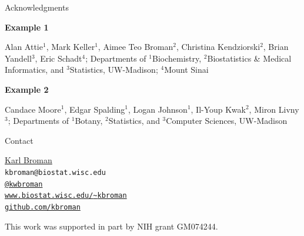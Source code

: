 \documentclass[final,plain]{beamer}
\newlength{\onecolwid}
\newcommand{\bluebold}{\color{dblue} \bf}
\newcommand{\coltwovsep}{\vspace{35.5mm}}
\begin{document}
\begin{frame}[t]
\begin{columns}[t]
\begin{column}{\onecolwid}
    \begin{block}{Acknowledgments}

      {\bluebold Example 1}

          \vspace{12pt}
          \hfill \begin{minipage}{0.165\paperwidth} Alan Attie$^1$,
            Mark Keller$^1$, Aimee Teo Broman$^2$, Christina
            Kendziorski$^2$, Brian Yandell$^3$, Eric Schadt$^4$;
            Departments of $^1$Biochemistry, $^2$Biostatistics \&
            Medical Informatics, and $^3$Statistics, UW-Madison;
            $^4$Mount Sinai
          \end{minipage}

          \vspace{24pt}

      {\bluebold Example 2}

          \vspace{12pt}
          \hfill \begin{minipage}{0.165\paperwidth} 
            Candace Moore$^1$, Edgar Spalding$^1$, Logan Johnson$^1$, Il-Youp Kwak$^2$,
            Miron Livny$^3$; Departments of $^1$Botany,
            $^2$Statistics, and $^3$Computer Sciences, UW-Madison
          \end{minipage}

    \end{block}

  \coltwovsep %

    \begin{block}{Contact}
      \hspace{5em}
        \begin{minipage}{22em}
        \href{http://www.biostat.wisc.edu/~kbroman}{Karl Broman}\\
        {\tt kbroman@biostat.wisc.edu}\\
        \href{http://twitter.com/kwbroman}{\tt @kwbroman} \\
        \href{http://www.biostat.wisc.edu/~kbroman}{\tt www.biostat.wisc.edu/{\textasciitilde}kbroman} \\
        \href{http://github.com/kbroman}{\tt github.com/kbroman}
        \end{minipage}

    \vspace{60pt}
    {\rmfamily \footnotesize
    \centerline{This work was supported in part by NIH grant GM074244.}}
    \end{block}


\end{column}
\end{columns}
\end{frame}
\end{document}
